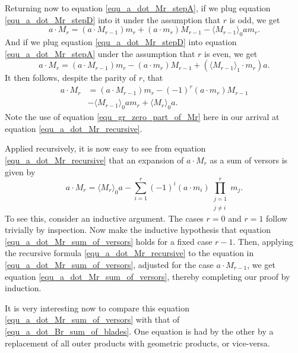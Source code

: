 \documentclass{birkjour}
\theoremstyle{definition}
\theoremstyle{remark}
\numberwithin{equation}{section}
\begin{document}
Returning now to equation \eqref{equ_a_dot_Mr_stepA}, if we plug equation \eqref{equ_a_dot_Mr_stepD} into it
under the assumption that $r$ is odd, we get
\begin{equation}
a\cdot M_r = (a\cdot M_{r-1})m_r + (a\cdot m_r)M_{r-1} - \langle M_{r-1}\rangle_0am_r.
\end{equation}
And if we plug equation \eqref{equ_a_dot_Mr_stepD} into equation \eqref{equ_a_dot_Mr_stepA} under the assumption
that $r$ is even, we get
\begin{equation}
a\cdot M_r = (a\cdot M_{r-1})m_r - (a\cdot m_r)M_{r-1} + (\langle M_{r-1}\rangle_1\cdot m_r)a.
\end{equation}
It then follows, despite the parity of $r$, that
\begin{align}
a\cdot M_r &= (a\cdot M_{r-1})m_r - (-1)^r(a\cdot m_r)M_{r-1}\nonumber \\
 &- \langle M_{r-1}\rangle_0am_r + \langle M_r\rangle_0a.\label{equ_a_dot_Mr_recursive}
\end{align}
Note the use of equation \eqref{equ_gr_zero_part_of_Mr} here in our arrival at equation \eqref{equ_a_dot_Mr_recursive}.

Applied recursively, it is now easy to see from equation \eqref{equ_a_dot_Mr_recursive} that an expansion of
$a\cdot M_r$ as a sum of versors is given by
\begin{equation}\label{equ_a_dot_Mr_sum_of_versors}
a\cdot M_r = \langle M_r\rangle_0a - \sum_{i=1}^r(-1)^i(a\cdot m_i)\prod_{\substack{j=1\\j\neq i}}^rm_j.
\end{equation}
To see this, consider an inductive argument.  The cases $r=0$ and $r=1$ follow trivially by inspection.
Now make the inductive hypothesis that equation \eqref{equ_a_dot_Mr_sum_of_versors} holds for a fixed case $r-1$.
Then, applying the recursive formula \eqref{equ_a_dot_Mr_recursive} to the equation in \eqref{equ_a_dot_Mr_sum_of_versors},
adjusted for the case $a\cdot M_{r-1}$, we get equation \eqref{equ_a_dot_Mr_sum_of_versors}, thereby completing
our proof by induction.

It is very interesting now to compare this equation \eqref{equ_a_dot_Mr_sum_of_versors} with that of \eqref{equ_a_dot_Br_sum_of_blades}.
One equation is had by the other by a replacement of all outer products with geometric products, or vice-versa.
\end{document}
